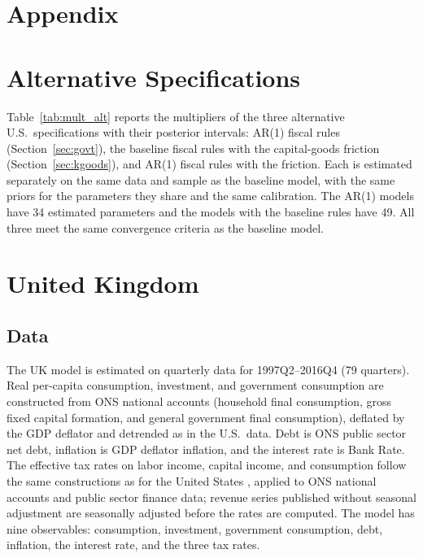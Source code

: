 \renewcommand{\theequation}{A.\arabic{section}.\arabic{equation}}
\renewcommand{\thesection}{A-\arabic{section}}
\setcounter{equation}{0}
\setcounter{section}{0}
\section*{Appendix}

\section{Alternative Specifications}
\label{app:alt}

Table~\ref{tab:mult_alt} reports the multipliers of the three alternative U.S.\ specifications with their posterior intervals: AR(1) fiscal rules (Section~\ref{sec:govt}), the baseline fiscal rules with the capital-goods friction (Section~\ref{sec:kgoods}), and AR(1) fiscal rules with the friction. Each is estimated separately on the same data and sample as the baseline model, with the same priors for the parameters they share and the same calibration. The AR(1) models have 34 estimated parameters and the models with the baseline rules have 49. All three meet the same convergence criteria as the baseline model.



\clearpage

\section{United Kingdom}
\label{app:uk}

\subsection*{Data}

The UK model is estimated on quarterly data for 1997Q2--2016Q4 (79 quarters). Real per-capita consumption, investment, and government consumption are constructed from ONS national accounts (household final consumption, gross fixed capital formation, and general government final consumption), deflated by the GDP deflator and detrended as in the U.S.\ data. Debt is ONS public sector net debt, inflation is GDP deflator inflation, and the interest rate is Bank Rate. The effective tax rates on labor income, capital income, and consumption follow the same constructions as for the United States \cite{Jones2002,Mendoza_et_al_1994}, applied to ONS national accounts and public sector finance data; revenue series published without seasonal adjustment are seasonally adjusted before the rates are computed. The model has nine observables: consumption, investment, government consumption, debt, inflation, the interest rate, and the three tax rates.

